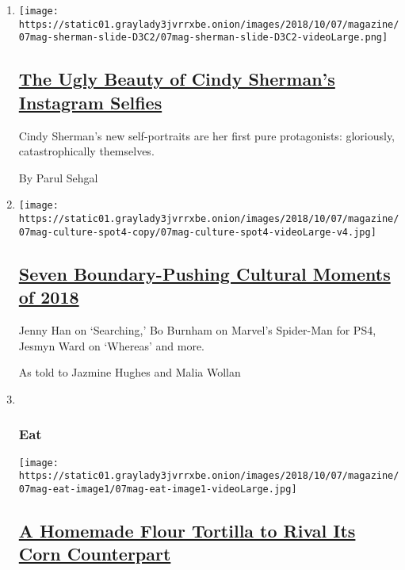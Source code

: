 \begin{enumerate}
\def\labelenumi{\arabic{enumi}.}
\item
  \texttt{[image: https://static01.graylady3jvrrxbe.onion/images/2018/10/07/magazine/07mag-sherman-slide-D3C2/07mag-sherman-slide-D3C2-videoLarge.png]}

  \hypertarget{the-ugly-beauty-of-cindy-shermans-instagram-selfies}{%
  \subsection{\texorpdfstring{\href{/interactive/2018/10/05/magazine/instagram-cindy-sherman-ugly-beauty.html}{The
  Ugly Beauty of Cindy Sherman's Instagram
  Selfies}}{The Ugly Beauty of Cindy Sherman's Instagram Selfies}}\label{the-ugly-beauty-of-cindy-shermans-instagram-selfies}}

  Cindy Sherman's new self-portraits are her first pure protagonists:
  gloriously, catastrophically themselves.

  By Parul Sehgal
\item
  \texttt{[image: https://static01.graylady3jvrrxbe.onion/images/2018/10/07/magazine/07mag-culture-spot4-copy/07mag-culture-spot4-videoLarge-v4.jpg]}

  \hypertarget{seven-boundary-pushing-cultural-moments-of-2018}{%
  \subsection{\texorpdfstring{\href{/interactive/2018/10/05/magazine/culture-moments-2018.html}{Seven
  Boundary-Pushing Cultural Moments of
  2018}}{Seven Boundary-Pushing Cultural Moments of 2018}}\label{seven-boundary-pushing-cultural-moments-of-2018}}

  Jenny Han on `Searching,' Bo Burnham on Marvel's Spider-Man for PS4,
  Jesmyn Ward on `Whereas' and more.

  As told to Jazmine Hughes and Malia Wollan
\item ~
  \hypertarget{eat}{%
  \subsubsection{Eat}\label{eat}}

  \texttt{[image: https://static01.graylady3jvrrxbe.onion/images/2018/10/07/magazine/07mag-eat-image1/07mag-eat-image1-videoLarge.jpg]}

  \hypertarget{a-homemade-flour-tortilla-to-rival-its-corn-counterpart}{%
  \subsection{\texorpdfstring{\href{/2018/10/03/magazine/homemade-flour-tortilla.html}{A
  Homemade Flour Tortilla to Rival Its Corn
  Counterpart}}{A Homemade Flour Tortilla to Rival Its Corn Counterpart}}\label{a-homemade-flour-tortilla-to-rival-its-corn-counterpart}}


\end{enumerate}
